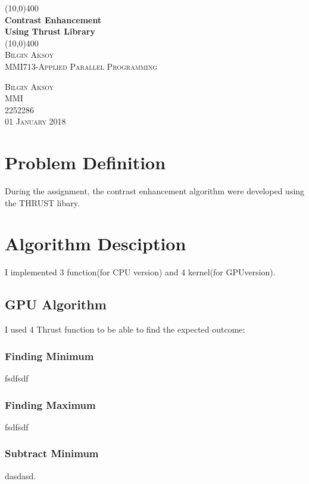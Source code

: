 \documentclass[11pt]{article} %
\title{}
\author{}
\begin{document}
\begin{titlepage}
	\begin{center}
		\line(10,0){400}\\
		[4mm] %
		\huge{\bfseries Contrast Enhancement} \\
		\huge{\bfseries Using Thrust Library} \\
		[1mm]
		\line(10,0){400}\\
		[1 cm]
		\textsc{\LARGE Bilgin Aksoy}\\
		[1 cm]
		\textsc{\large MMI713-Applied Parallel Programming}\\
		[10 cm]
	\end{center}
	
	\begin{flushright}
		\textsc{\large Bilgin Aksoy\\
		MMI\\
		2252286\\
		01 January 2018\\
		}
	\end{flushright}
\end{titlepage} 
\setcounter{page}{1}

\section{Problem Definition }
	\justifying During the assignment, the contrast enhancement algorithm were developed using the THRUST libary.
\section{Algorithm Desciption}
	\justifying I implemented 3 function(for CPU version) and 4 kernel(for GPUversion). \\
	\subsection{GPU Algorithm}
		\justifying I used 4 Thrust function to be able to find the expected outcome:
		\subsubsection{Finding Minimum} fsdfsdf 
		\subsubsection{Finding Maximum} fsdfsdf 	
		\subsubsection{Subtract Minimum} dasdasd. 
\end{document}
